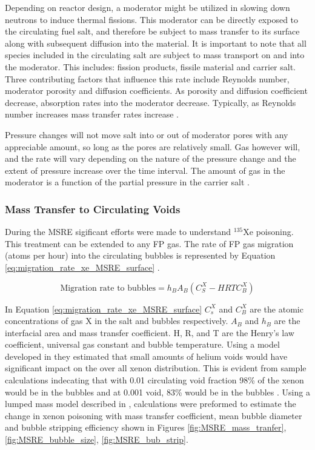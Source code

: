 Depending on reactor design, a moderator might be utilized in slowing down neutrons to induce thermal fissions. This moderator can be directly exposed to the circulating fuel salt, and therefore be subject to mass transfer to its surface along with subsequent diffusion into the material. It is important to note that all species included in the circulating salt are subject to mass transport on and into the moderator. This includes: fission products, fissile material and carrier salt. Three contributing factors that influence this rate include Reynolds number, moderator porosity and diffusion coefficients. As porosity and diffusion coefficient decrease, absorption rates into the moderator decrease. Typically, as Reynolds number increases mass transfer rates increase \cite{watson1962}. 

Pressure changes will not move salt into or out of moderator pores with any appreciable amount, so long as the pores are relatively small. Gas however will, and the rate will vary depending on the nature of the pressure change and the extent of pressure increase over the time interval. The amount of gas in the moderator is a function of the partial pressure in the carrier salt \cite{kedl1972}.

\subsubsection{Mass Transfer to Circulating Voids}
During the MSRE sigificant efforts were made to understand ${}^{135}$Xe poisoning. This treatment can be extended to any FP gas. The rate of FP gas migration (atoms per hour) into the circulating bubbles is represented by Equation \ref{eq:migration_rate_xe_MSRE_surface} \cite{houtzeel1967}.

\begin{equation}
    \text{Migration rate to bubbles} = h_{B}A_{B}(C_{S}^{X} - HRTC_{B}^{X})
    \label{eq:migration_rate_xe_MSRE_surface}
\end{equation}

In Equation \ref{eq:migration_rate_xe_MSRE_surface} $C_{s}^{X}$ and $C_{B}^{X}$ are the atomic concentrations of gas X in the salt and bubbles respectively. $A_{B}$ and $h_{B}$ are the interfacial area and mass transfer coefficient. H, R, and T are the Henry's law coefficient, universal gas constant and bubble temperature. Using a model developed in \cite{houtzeel1967} they estimated that small amounts of helium voids would have significant impact on the over all xenon distribution. This is evident from sample calculations indecating that with 0.01 circulating void fraction 98\% of the xenon would be in the bubbles and at 0.001 void, 83\% would be in the bubbles \cite{houtzeel1967}. Using a lumped mass model described in \cite{houtzeel1967}, calculations were preformed to estimate the change in xenon poisoning with mass transfer coefficient, mean bubble diameter and bubble stripping efficiency shown in Figures \ref{fig:MSRE_mass_tranfer}, \ref{fig:MSRE_bubble_size}, \ref{fig:MSRE_bub_strip}.

